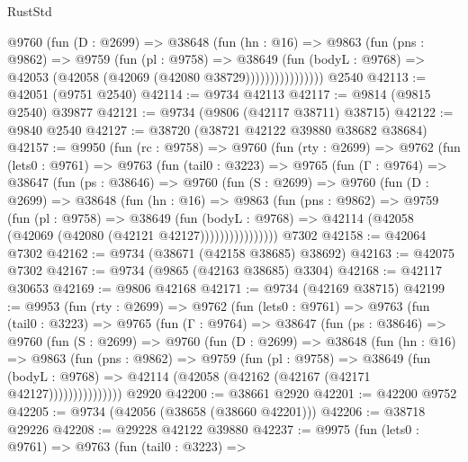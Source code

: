 \begin{lexlean}{RustStd}
\begin{coremodule}
                  @9760
                    (fun (D : @2699) =>
                    @38648
                      (fun (hn : @16) =>
                      @9863
                        (fun (pns : @9862) =>
                        @9759
                          (fun (pl : @9758) =>
                          @38649
                            (fun (bodyL : @9768) =>
                            @42053 (@42058 (@42069 (@42080 @38729))))))))))))))))
    @2540
@42113 := @42051 (@9751 @2540)
@42114 := @9734 @42113
@42117 := @9814 (@9815 @2540) @39877
@42121 := @9734 (@9806 (@42117 @38711) @38715)
@42122 := @9840 @2540
@42127 := @38720 (@38721 @42122 @39880 @38682 @38684)
@42157 := @9950
    (fun (rc : @9758) =>
    @9760
      (fun (rty : @2699) =>
      @9762
        (fun (lets0 : @9761) =>
        @9763
          (fun (tail0 : @3223) =>
          @9765
            (fun (Γ : @9764) =>
            @38647
              (fun (ps : @38646) =>
              @9760
                (fun (S : @2699) =>
                @9760
                  (fun (D : @2699) =>
                  @38648
                    (fun (hn : @16) =>
                    @9863
                      (fun (pns : @9862) =>
                      @9759
                        (fun (pl : @9758) =>
                        @38649
                          (fun (bodyL : @9768) =>
                          @42114 (@42058 (@42069 (@42080 (@42121 @42127))))))))))))))))
    @7302
@42158 := @42064 @7302
@42162 := @9734 (@38671 (@42158 @38685) @38692)
@42163 := @42075 @7302
@42167 := @9734 (@9865 (@42163 @38685) @3304)
@42168 := @42117 @30653
@42169 := @9806 @42168
@42171 := @9734 (@42169 @38715)
@42199 := @9953
    (fun (rty : @2699) =>
    @9762
      (fun (lets0 : @9761) =>
      @9763
        (fun (tail0 : @3223) =>
        @9765
          (fun (Γ : @9764) =>
          @38647
            (fun (ps : @38646) =>
            @9760
              (fun (S : @2699) =>
              @9760
                (fun (D : @2699) =>
                @38648
                  (fun (hn : @16) =>
                  @9863
                    (fun (pns : @9862) =>
                    @9759
                      (fun (pl : @9758) =>
                      @38649
                        (fun (bodyL : @9768) =>
                        @42114 (@42058 (@42162 (@42167 (@42171 @42127)))))))))))))))
    @2920
@42200 := @38661 @2920
@42201 := @42200 @9752
@42205 := @9734 (@42056 (@38658 (@38660 @42201)))
@42206 := @38718 @29226
@42208 := @29228 @42122 @39880
@42237 := @9975
    (fun (lets0 : @9761) =>
    @9763
      (fun (tail0 : @3223) =>

\end{coremodule}
\end{lexlean}
